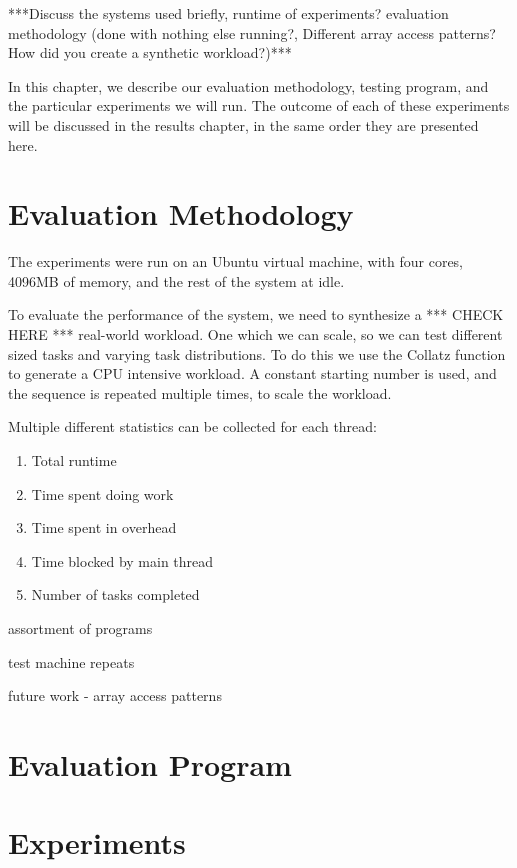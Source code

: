 
***Discuss the systems used briefly, runtime of experiments? evaluation methodology (done with nothing else running?, Different array access patterns? How did you create a synthetic workload?)***

In this chapter, we describe our evaluation methodology, testing program, and the particular experiments we will run. The outcome of each of these experiments will be discussed in the results chapter, in the same order they are presented here.



\section{Evaluation Methodology}

The experiments were run on an Ubuntu virtual machine, with four cores, 4096MB of memory, and the rest of the system at idle.

To evaluate the performance of the system, we need to synthesize a *** CHECK HERE *** real-world workload. One which we can scale, so we can test different sized tasks and varying task distributions. To do this we use the Collatz function to generate a CPU intensive workload. A constant starting number is used, and the sequence is repeated multiple times, to scale the workload.

Multiple different statistics can be collected for each thread:

\begin{enumerate}
	\item Total runtime
	\item Time spent doing work
	\item Time spent in overhead
	\item Time blocked by main thread
	\item Number of tasks completed
\end{enumerate}

assortment of programs

test machine
repeats

future work - array access patterns



\section{Evaluation Program}



\section{Experiments}

